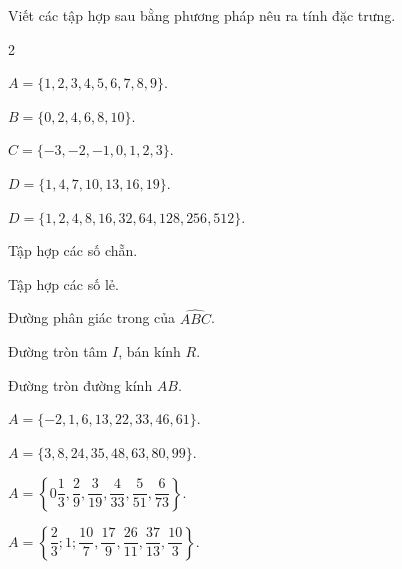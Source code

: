 \begin{bt}%
	Viết các tập hợp sau bằng phương pháp nêu  ra tính đặc trưng.
	\begin{enumEX}{2}
		 \item $ A=\{1,2,3,4,5,6,7,8,9 \} $.
		\item $  B=\{0,2,4,6,8,10 \} $.
		\item $ C=\{-3,-2,-1,0,1,2,3\} $. 
		\item $ D=\{1,4,7,10,13,16,19\}  $.
		\item $ D=\{1,2,4,8,16,32,64,128,256,512\} $. 
		\item Tập hợp các  số chẵn.
		 \item Tập hợp các số lẻ.
		\item Đường phân giác trong của  $ \widehat{ABC} $.
		\item Đường tròn tâm $ I $, bán kính $ R  $.
		\item Đường tròn  đường kính $ AB $.
		\item $  A=\{-2,1,6,13,22,33,46,61\} $.
		\item $  A=\{3,8,24,35,48,63,80,99\} $.
		\item $ A=\left\{0\dfrac{1}{3},\dfrac{2}{9},\dfrac{3}{19},\dfrac{4}{33},\dfrac{5}{51},\dfrac{6}{73}\right\}  $.
		\item $ A=\left\{\dfrac{2}{3};1;\dfrac{10}{7},\dfrac{17}{9},\dfrac{26}{11}, \dfrac{37}{13},\dfrac{10}{3}\right\}  $.
	\end{enumEX}
\end{bt}

